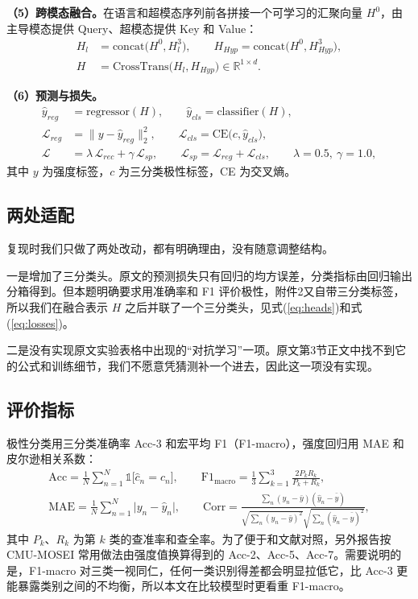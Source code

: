 \textbf{（5）跨模态融合。}在语言和超模态序列前各拼接一个可学习的汇聚向量 $H^0$，由主导模态提供 Query、超模态提供 Key 和 Value：
\begin{align}
H_l&=\mathrm{concat}\big(H^0,H_l^3\big),\qquad H_{Hyp}=\mathrm{concat}\big(H^0,H_{Hyp}^3\big),\label{eq:fusein}\\
H&=\mathrm{CrossTrans}\big(H_l,H_{Hyp}\big)\in\mathbb{R}^{1\times d}.\label{eq:fuse}
\end{align}

\textbf{（6）预测与损失。}
\begin{align}
\hat y_{reg}&=\mathrm{regressor}(H),\qquad \hat y_{cls}=\mathrm{classifier}(H),\label{eq:heads}\\
\mathcal{L}_{reg}&=\big\|y-\hat y_{reg}\big\|_2^2,\qquad \mathcal{L}_{cls}=\mathrm{CE}\big(c,\hat y_{cls}\big),\label{eq:losses}\\
\mathcal{L}&=\lambda\,\mathcal{L}_{rec}+\gamma\,\mathcal{L}_{sp},\qquad \mathcal{L}_{sp}=\mathcal{L}_{reg}+\mathcal{L}_{cls},\qquad \lambda=0.5,\ \gamma=1.0,\label{eq:total}
\end{align}
其中 $y$ 为强度标签，$c$ 为三分类极性标签，CE 为交叉熵。

\subsection{两处适配}

复现时我们只做了两处改动，都有明确理由，没有随意调整结构。

一是增加了三分类头。原文的预测损失只有回归的均方误差，分类指标由回归输出分箱得到。但本题明确要求用准确率和 F1 评价极性，附件2又自带三分类标签，所以我们在融合表示 $H$ 之后并联了一个三分类头，见式(\ref{eq:heads})和式(\ref{eq:losses})。

二是没有实现原文实验表格中出现的“对抗学习”一项。原文第3节正文中找不到它的公式和训练细节，我们不愿意凭猜测补一个进去，因此这一项没有实现。

\subsection{评价指标}\label{sec:metrics}

极性分类用三分类准确率 Acc-3 和宏平均 F1（F1-macro），强度回归用 MAE 和皮尔逊相关系数：
\begin{gather}
\mathrm{Acc}=\frac{1}{N}\sum_{n=1}^{N}\mathbb{1}\big[\hat c_n=c_n\big],\qquad
\mathrm{F1}_{\mathrm{macro}}=\frac{1}{3}\sum_{k=1}^{3}\frac{2P_kR_k}{P_k+R_k},\label{eq:clsmetric}\\
\mathrm{MAE}=\frac{1}{N}\sum_{n=1}^{N}\big|y_n-\hat y_n\big|,\qquad
\mathrm{Corr}=\frac{\sum_n(y_n-\bar y)(\hat y_n-\bar{\hat y})}{\sqrt{\sum_n(y_n-\bar y)^2}\sqrt{\sum_n(\hat y_n-\bar{\hat y})^2}},\label{eq:regmetric}
\end{gather}
其中 $P_k$、$R_k$ 为第 $k$ 类的查准率和查全率。为了便于和文献对照，另外报告按 CMU-MOSEI 常用做法由强度值换算得到的 Acc-2、Acc-5、Acc-7。需要说明的是，F1-macro 对三类一视同仁，任何一类识别得差都会明显拉低它，比 Acc-3 更能暴露类别之间的不均衡，所以本文在比较模型时更看重 F1-macro。
